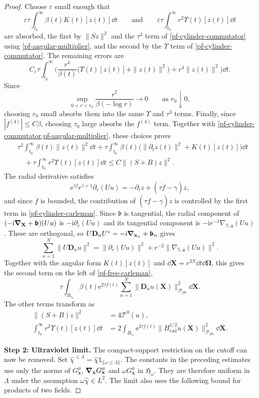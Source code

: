 \documentclass[final,reqno]{amsart}
\theoremstyle{remark}
\newcommand{\iden}{\mathbb{1}}
\renewcommand{\i}{\mathrm{i}}
\newcommand{\e}{\mathrm{e}}
\newcommand{\vbf}{\bm{\mathfrak{b}}}
\newcommand{\ph}{\mathrm{ph}}
\newcommand{\rad}{\mathrm{rad}}
\newcommand{\Fock}{\mathcal{F}}
\newcommand{\Hil}{\mathfrak{H}}
\newcommand{\vOmega}{{\bm{\Omega}}}
\newcommand{\vx}{\mathbf{x}}
\newcommand{\vX}{{\mathbf{X}}}
\newcommand{\vD}{{\mathbf{D}}}
\newcommand{\wh}[1]{\widehat{#1}}
\renewcommand{\epsilon}{\varepsilon}
\begin{document}
\begin{proof}
Choose $\epsilon$ small enough that
\[
 \epsilon\tau\int_{t_0}^\infty\beta(t)K(t)[z(t)]\dd t
 \qquad\text{and}\qquad
 \epsilon\tau\int_{t_0}^\infty r^2\Upsilon(t)[z(t)]\dd t
\]
are absorbed, the first by $\|Sz\|^2$ and the $\tau^3$ term of
\cref{pf-cylinder-commutator} using \cref{pf-angular-multiplier}, and
the second by the $\Upsilon$ term of \cref{pf-cylinder-commutator}.  The
remaining errors are
\[
 C_\epsilon\tau\int_{t_0}^\infty\Big(\frac{r^4}{\beta(t)}
   \big(\Upsilon(t)[z(t)]+\|z(t)\|^2\big)+r^4\|z(t)\|^2\Big)\dd t.
\]
Since
\[
 \sup_{0<r<r_0}\frac{r^2}{\beta(-\log r)}\longrightarrow0
 \qquad\text{as }r_0\downarrow0,
\]
choosing $r_0$ small absorbs them into the same $\Upsilon$ and $\tau^3$
terms.  Finally, since $|f^{(4)}|\leq C\beta$, choosing $\tau_0$ large
absorbs the $f^{(4)}$ term.
Together with \cref{pf-cylinder-commutator,pf-angular-multiplier},
these choices prove
\begin{align}
 &\tau^3\int_{t_0}^\infty\beta(t)\|z(t)\|^2\dd t
  +\tau\int_{t_0}^\infty\beta(t)\big(\|\partial_tz(t)\|^2+K(t)[z(t)]\big)\dd t
   \nonumber\\
 &\quad+\tau\int_{t_0}^\infty r^2\Upsilon(t)[z(t)]\dd t
  \leq C\|(S+B)z\|^2.
 \label{pf-cylinder-carleman}
\end{align}
The radial derivative satisfies
\[
 \e^{\tau f}r^{\gamma+1}\partial_r(Uu)
       =-\partial_tz+(\tau\dot f-\gamma)z,
\]
and since $\dot f$ is bounded, the contribution of $(\tau\dot f-\gamma)z$ is
controlled by the first term in \cref{pf-cylinder-carleman}.
Since $\vbf$ is tangential, the radial component of
$(-\i\grad_\vX+\vbf)(Uu)$ is $-\i\partial_r(Uu)$ and its tangential
component is $-\i r^{-1}\nabla_{\mathbb S,\mathfrak a}(Uu)$.  These are
orthogonal, so $U\vD_nU^*=-\i\grad_{\vx_n}+\vbf_n$ gives
\[
 \sum_{n=1}^N\|U\vD_nu\|^2
 =\|\partial_r(Uu)\|^2+r^{-2}\|\nabla_{\mathbb S,\mathfrak a}(Uu)\|^2.
\]
Together with the angular form $K(t)[z(t)]$ and
$\dd\vX=r^{3N}\dd t\dd\vOmega$, this gives the second term on the
left of \cref{pf-free-carleman},
\[
 \tau\int_{B_{r_0}}\beta(t)\e^{2\tau f(t)}\sum_{n=1}^N\|\vD_nu(\vX)\|_{\Fock_\ph}^2\dd\vX.
\]
The other terms transform as
\begin{align*}
 \|(S+B)z\|^2
       &=4\mathcal T^0(u),\\
 \int_{t_0}^\infty r^2\Upsilon(t)[z(t)]\dd t
       &=2\int_{B_{r_0}}\e^{2\tau f(t)}\|H_\rad^{1/2}u(\vX)\|_{\Fock_\ph}^2\dd \vX.
\end{align*}

\noindent\textbf{Step 2: Ultraviolet limit.}
The compact-support restriction on the cutoff can now be removed.
Set $\wh\chi^{\le\Lambda}=\wh\chi\iden_{\{\omega\leq\Lambda\}}$.
The constants in the preceding estimates use only the norms of
$G^\mu_\vx$, $\grad_\vx G^\mu_\vx$ and $\omega G^\mu_\vx$ in $\Hil_\omega$.
They are therefore uniform in $\Lambda$ under the assumption
$\omega\wh\chi\in L^2$.
The limit also uses the following bound for products of two fields.


\end{proof}
\end{document}

